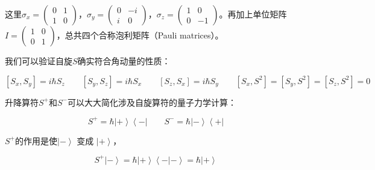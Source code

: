 这里$\sigma_x = \left( \begin{array}{ccc} 0 &  1 \\ 1 & 0 \end{array} \right) $，$\sigma_y = \left( \begin{array}{ccc} 0 &  -i \\ i & 0 \end{array} \right) $，$\sigma_z = \left( \begin{array}{ccc} 1 &  0 \\ 0 & -1 \end{array} \right) $。再加上单位矩阵$I =  \left( \begin{array}{ccc} 1 &  0 \\ 0 & 1 \end{array} \right)$，总共四个合称泡利矩阵（Pauli matrices）。





我们可以验证自旋$S$确实符合角动量的性质：

\begin{equation}
\left[ S_x , S_y  \right]   =  i \hbar S_z \qquad
\left[ S_y , S_z  \right]   =  i \hbar S_x \qquad
\left[ S_z , S_x  \right]   =  i \hbar S_y \qquad
\left[S_x , S^2 \right]  =  \left[S_y , S^2 \right] = \left[S_z , S^2 \right] = 0~
\end{equation}

升降算符$S^+$和$S^-$可以大大简化涉及自旋算符的量子力学计算：


\begin{equation}
S^+ = \hbar  \left| + \right\rangle \left\langle - \right| \qquad
S^- = \hbar  \left| - \right\rangle \left\langle + \right|~
\end{equation}

$S^+$的作用是使$\left| - \right\rangle$ 变成 $\left| + \right\rangle$，

\begin{equation}
S^+ \left| - \right\rangle = \hbar  \left| + \right\rangle \left\langle -  | -   \right\rangle = \hbar \left| + \right\rangle~
\end{equation}

